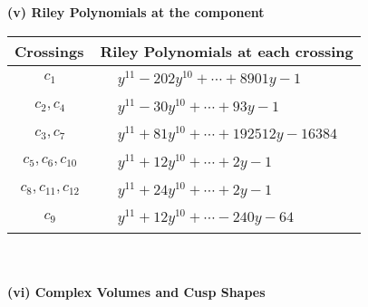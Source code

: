 \documentclass[1p]{elsarticle_modified}
\theoremstyle{definition}
\begin{document}
\newpage\renewcommand{\arraystretch}{1}
\flushleft \textbf{(v) Riley Polynomials at the component}\newline \\
\begin{tabular}{m{50pt}|m{274pt}}
Crossings & \hspace{64pt}Riley Polynomials at each crossing \\
\hline $$\begin{aligned}c_{1}\end{aligned}$$&$\begin{aligned}
&y^{11}-202 y^{10}+\cdots+8901 y-1
\end{aligned}$\\
\hline $$\begin{aligned}c_{2},c_{4}\end{aligned}$$&$\begin{aligned}
&y^{11}-30 y^{10}+\cdots+93 y-1
\end{aligned}$\\
\hline $$\begin{aligned}c_{3},c_{7}\end{aligned}$$&$\begin{aligned}
&y^{11}+81 y^{10}+\cdots+192512 y-16384
\end{aligned}$\\
\hline $$\begin{aligned}c_{5},c_{6},c_{10}\end{aligned}$$&$\begin{aligned}
&y^{11}+12 y^{10}+\cdots+2 y-1
\end{aligned}$\\
\hline $$\begin{aligned}c_{8},c_{11},c_{12}\end{aligned}$$&$\begin{aligned}
&y^{11}+24 y^{10}+\cdots+2 y-1
\end{aligned}$\\
\hline $$\begin{aligned}c_{9}\end{aligned}$$&$\begin{aligned}
&y^{11}+12 y^{10}+\cdots-240 y-64
\end{aligned}$\\
\hline
\end{tabular}\\~\\
\newpage\flushleft \textbf{(vi) Complex Volumes and Cusp Shapes}
\end{document}
